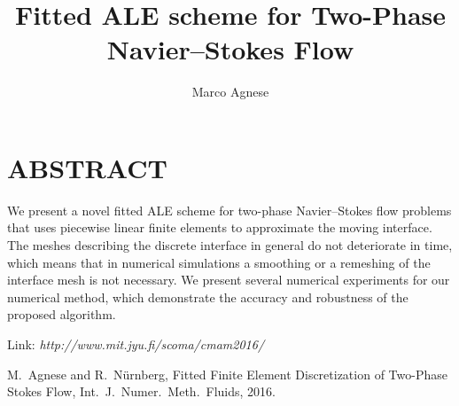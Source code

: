 \documentclass{smpstyle}
\title{Fitted ALE scheme for Two-Phase Navier--Stokes Flow}
\author{Marco Agnese}
\begin{document}
\maketitle

\section*{ABSTRACT}


We present a novel fitted ALE scheme for two-phase Navier--Stokes flow problems
that uses piecewise linear finite elements to approximate the moving interface.
The meshes describing the discrete interface in general do not deteriorate in
time, which means that in numerical simulations a smoothing or a remeshing of
the interface mesh is not necessary. We present several numerical experiments
for our numerical method, which demonstrate the accuracy and
robustness of the proposed algorithm.

Link: \emph{http://www.mit.jyu.fi/scoma/cmam2016/}

\begin{thebibliography}{99}
M.~Agnese and R.~N\"urnberg, Fitted Finite Element Discretization of Two-Phase
{S}tokes Flow, Int.\ J.\ Numer.\ Meth.\ Fluids, 2016.

\end{thebibliography}
\end{document}
